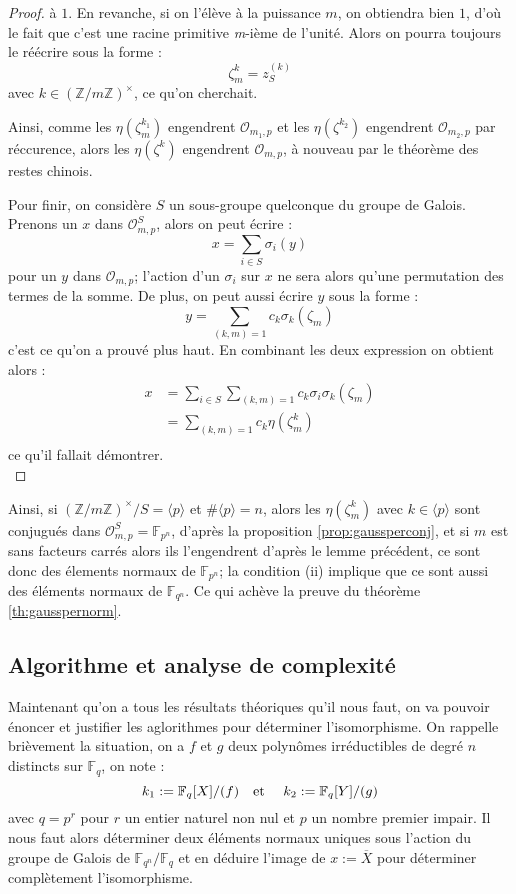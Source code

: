 \documentclass[a4paper]{article} %
\numberwithin{section}{part}
\numberwithin{equation}{section}
\newcommand\nroot[1]{\textit{#1}-ième}
\newcommand\zmodninv[1]{(\mathbb{Z}/#1\mathbb{Z})^{\times}}
\newcommand\GF[1]{\mathbb{F}_{#1}}
\newcommand\EO{\mathcal{O}}
\newcommand\etmath{\textup{\quad et \quad}}
\newcommand\groupgen[1]{\langle{#1}\rangle}
\begin{document}
\begin{proof}
à $1$. En revanche, si on l'élève à la puissance $m$, on obtiendra bien $1$, 
d'où le fait que c'est une racine primitive \nroot{m} de l'unité. Alors on 
pourra toujours le réécrire sous la forme : 
\[\zeta_m^k = z_S^{(k)}\]
avec $k\in\zmodninv{m}$, ce qu'on cherchait.\par
\fi
Ainsi, comme les $\eta(\zeta_m^{k_1})$ engendrent $\EO_{m_1,p}$ et les 
$\eta(\zeta^{k_2})$ engendrent $\EO_{m_2,p}$ par réccurence, alors les 
$\eta(\zeta^k)$ engendrent $\EO_{m,p}$, à nouveau par le théorème des restes 
chinois.\par
Pour finir, on considère $S$ un sous-groupe quelconque du groupe de Galois. 
Prenons un $x$ dans $\EO_{m,p}^S$, alors on peut écrire :
\begin{equation}
x = \sum_{i\in S}{\sigma_i(y)}
\end{equation}
pour un $y$ dans $\EO_{m,p}$; l'action d'un $\sigma_i$ sur $x$ ne sera alors
qu'une permutation des termes de la somme. De plus, on peut aussi écrire $y$ 
sous la forme :
\begin{equation}
y = \sum_{(k,m)=1}{c_k\sigma_k(\zeta_m)}
\end{equation}
c'est ce qu'on a prouvé plus haut. En combinant les deux expression on obtient 
alors :
\begin{align*}
x &= \sum_{i\in S}{\sum_{(k,m)=1}{c_k\sigma_i\sigma_k(\zeta_m)}}\\
&= \sum_{(k,m)=1}{c_k\eta(\zeta_m^k)}\\
\end{align*}
ce qu'il fallait démontrer.\\
\end{proof}

Ainsi, si $\zmodninv{m}/S = \groupgen{p}$ et $\#\groupgen{p} = n$, alors les 
$\eta(\zeta_m^k)$ avec $k\in\groupgen{p}$ sont conjugués dans $\EO_{m,p}^S = 
\GF{p^n}$, d'après la proposition \ref{prop:gaussperconj}, et si $m$ est sans 
facteurs carrés alors ils l'engendrent d'après le lemme précédent, ce sont donc 
des élements normaux de $\GF{p^n}$; la condition (ii) implique que ce sont aussi
des éléments normaux de $\GF{q^n}$. Ce qui achève la preuve du théorème 
\ref{th:gausspernorm}.

\subsection{Algorithme et analyse de complexité}
\label{sec:algcompcycl}
Maintenant qu'on a tous les résultats théoriques qu'il nous faut, on va pouvoir
énoncer et justifier les aglorithmes pour déterminer l'isomorphisme. 
On rappelle brièvement la situation, on a $f$ et $g$ deux polynômes 
irréductibles de degré $n$ distincts sur $\GF{q}$, on note :
\[k_1 := \GF{q}[X]/(f)\etmath k_2 := \GF{q}[Y]/(g)\]
avec $q = p^r$ pour $r$ un entier naturel non nul et $p$ un nombre premier
impair. Il nous faut alors déterminer deux éléments normaux uniques sous
l'action du groupe de Galois de $\GF{q^n}/\GF{q}$ et en déduire l'image de $x :=
\overline{X}$ pour déterminer complètement l'isomorphisme. 
\end{document}
